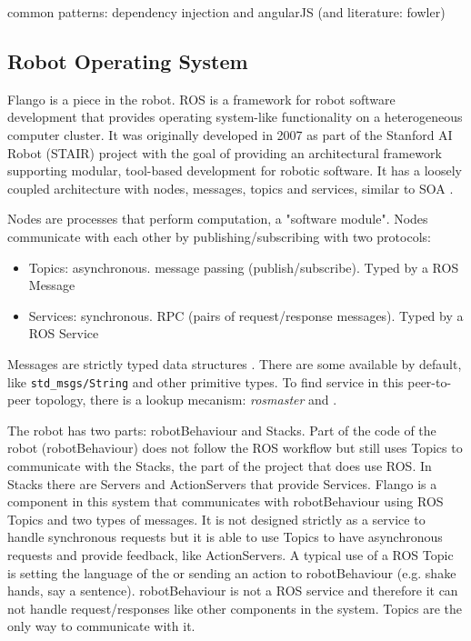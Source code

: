 common patterns:
dependency injection and angularJS (and literature: fowler)

\subsection{Robot Operating System}
Flango \cm is a piece in the robot.
\ac{ROS} is a framework for robot software development that provides operating system-like functionality on a heterogeneous computer cluster. 
It was originally developed in 2007 as part of the Stanford AI Robot (STAIR) project with the goal of providing an architectural framework supporting modular, tool-based development for robotic software.
It has a loosely coupled architecture with nodes, messages, topics and services, similar to \ac{SOA} \cite{ROS:2009}.

Nodes are processes that perform computation, a "software module". 
Nodes communicate with each other by publishing/subscribing with two protocols:
\begin{itemize}
\item Topics: asynchronous. message passing (publish/subscribe). Typed by a \ac{ROS} Message
\item Services: synchronous. \ac{RPC} (pairs of request/response messages). Typed by a \ac{ROS} Service
\end{itemize}

Messages are strictly typed data structures . There are some available by default, like \texttt{std\_msgs/String} and other primitive types.
To find service in this peer-to-peer topology, there is a lookup mecanism: \emph{rosmaster}  and .

The robot has two parts: robotBehaviour and Stacks.
Part of the code of the robot (robotBehaviour) does not follow the \ac{ROS} workflow but still uses Topics to communicate with the Stacks, the part of the project that does use \ac{ROS}.
In Stacks there are Servers and ActionServers that provide Services.
Flango \cm is a component in this system that communicates with robotBehaviour using \ac{ROS} Topics and two types of messages.
It is not designed strictly as a service to handle synchronous requests but it is able to use Topics to have asynchronous requests and provide feedback, like ActionServers.
A typical use of a \ac{ROS} Topic is setting the language of the \cm or sending an action to robotBehaviour (e.g. shake hands, say a sentence).
robotBehaviour is not a \ac{ROS} service and therefore it can not handle request/responses like other components in the system.
Topics are the only way to communicate with it.

